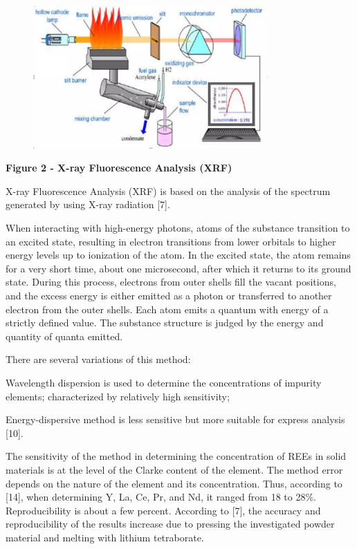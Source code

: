 \begin{figure}[H]
	\centering
	\includegraphics[width=0.8\textwidth]{assets/1050}
	\caption*{}
\end{figure}

{\bfseries Figure 2 - X-ray Fluorescence Analysis (XRF)}

X-ray Fluorescence Analysis (XRF) is based on the analysis of the
spectrum generated by using X-ray radiation {[}7{]}.

When interacting with high-energy photons, atoms of the substance
transition to an excited state, resulting in electron transitions from
lower orbitals to higher energy levels up to ionization of the atom. In
the excited state, the atom remains for a very short time, about one
microsecond, after which it returns to its ground state. During this
process, electrons from outer shells fill the vacant positions, and the
excess energy is either emitted as a photon or transferred to another
electron from the outer shells. Each atom emits a quantum with energy of
a strictly defined value. The substance structure is judged by the
energy and quantity of quanta emitted.

There are several variations of this method:

Wavelength dispersion is used to determine the concentrations of
impurity elements; characterized by relatively high sensitivity;

Energy-dispersive method is less sensitive but more suitable for express
analysis {[}10{]}.

The sensitivity of the method in determining the concentration of REEs
in solid materials is at the level of the Clarke content of the element.
The method error depends on the nature of the element and its
concentration. Thus, according to {[}14{]}, when determining Y, La, Ce,
Pr, and Nd, it ranged from 18 to 28\%. Reproducibility is about a few
percent. According to {[}7{]}, the accuracy and reproducibility of the
results increase due to pressing the investigated powder material and
melting with lithium tetraborate.

